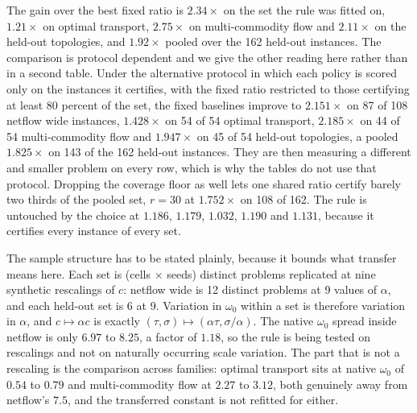 \begin{table}[t]
\end{table}

The gain over the best fixed ratio is $2.34\times$ on the set the rule was
fitted on, $1.21\times$ on optimal transport, $2.75\times$ on multi-commodity
flow and $2.11\times$ on the held-out topologies, and $1.92\times$ pooled over
the 162 held-out instances. The comparison is protocol dependent and we give the
other reading here rather than in a second table. Under the alternative protocol
in which each policy is scored only on the instances it certifies, with the
fixed ratio restricted to those certifying at least 80 percent of the set, the
fixed baselines improve to $2.151\times$ on 87 of 108 netflow wide instances,
$1.428\times$ on 54 of 54 optimal transport, $2.185\times$ on 44 of 54
multi-commodity flow and $1.947\times$ on 45 of 54 held-out topologies, a pooled
$1.825\times$ on 143 of the 162 held-out instances. They are then measuring a
different and smaller problem on every row, which is why the tables do not use
that protocol. Dropping the coverage floor as well lets one shared ratio certify
barely two thirds of the pooled set, $r = 30$ at $1.752\times$ on 108 of 162.
The rule is untouched by the choice at $1.186$, $1.179$, $1.032$, $1.190$ and
$1.131$, because it certifies every instance of every set.

The sample structure has to be stated plainly, because it bounds what transfer
means here. Each set is (cells $\times$ seeds) distinct problems replicated at
nine synthetic rescalings of $c$: netflow wide is 12 distinct problems at 9
values of $\alpha$, and each held-out set is 6 at 9. Variation in $\omega_0$
within a set is therefore variation in $\alpha$, and $c \mapsto \alpha c$ is
exactly $(\tau, \sigma) \mapsto (\alpha \tau, \sigma / \alpha)$. The native
$\omega_0$ spread inside netflow is only $6.97$ to $8.25$, a factor of $1.18$,
so the rule is being tested on rescalings and not on naturally occurring scale
variation. The part that is not a rescaling is the comparison across families:
optimal transport sits at native $\omega_0$ of $0.54$ to $0.79$ and
multi-commodity flow at $2.27$ to $3.12$, both genuinely away from netflow's
$7.5$, and the transferred constant is not refitted for either.

